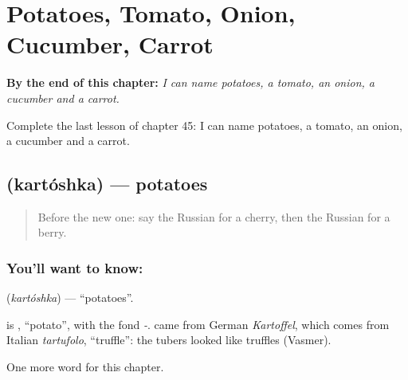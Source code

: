 
\chapter{Potatoes, Tomato, Onion, Cucumber, Carrot}
\label{ch:ru-potatoes-tomato-onion-cucumber-carrot}

\begin{chapteropening}
\textbf{By the end of this chapter:} \emph{I can name potatoes, a tomato, an onion, a cucumber and a carrot.}

Complete the last lesson of chapter 45: I can name potatoes, a tomato, an onion, a cucumber and a carrot.
\end{chapteropening}

\section[\texorpdfstring{\ru{картошка} (kartóshka)}{картошка (kartóshka)}]{ (kartóshka) — potatoes}

\label{lesson:RU-C45-potatoes}



\begin{quote}
Before the new one: say the Russian for a cherry, then the Russian for a berry.
\end{quote}

\subsection*{You'll want to know: }
\textbf{} (\emph{kartóshka}) — \textquotedblleft{}potatoes\textquotedblright{}.

\begin{cousinweb}
\textbf{} is \emph{}, \textquotedblleft{}potato\textquotedblright{}, with the fond \emph{-}. \emph{} came from German \emph{Kartoffel}, which comes from Italian \emph{tartufolo}, \textquotedblleft{}truffle\textquotedblright{}: the tubers looked like truffles (Vasmer).
\end{cousinweb}

\begin{grammarlens}[title={What you've built}]
One more word for this chapter.
\end{grammarlens}

